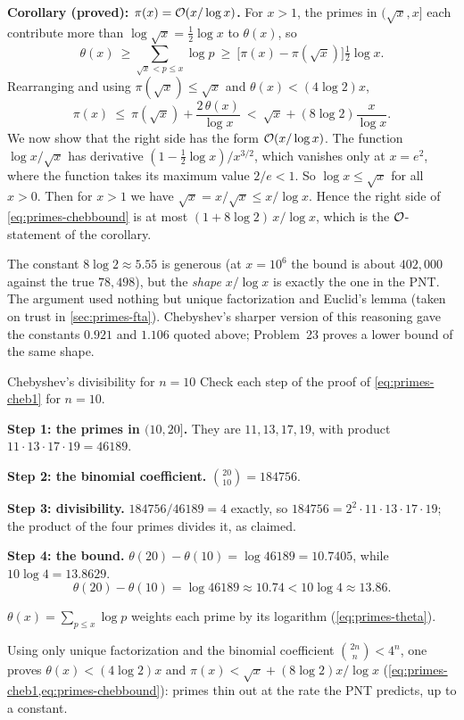 \textbf{Corollary (proved): $\pi(x)=\mathcal{O}(x/\log x)$.} For $x>1$, the primes in $(\sqrt x,x]$ each contribute more than $\log\sqrt x=\tfrac12\log x$ to $\theta(x)$, so
\[
\theta(x)\ \ge \sum_{\sqrt x<p\le x}\log p\ \ge\ \bigl[\pi(x)-\pi(\sqrt x)\bigr]\tfrac12\log x .
\]
Rearranging and using $\pi(\sqrt x)\le\sqrt x$ and $\theta(x)<(4\log2)x$,
\begin{equation}
\pi(x)\ \le\ \pi(\sqrt x)+\frac{2\,\theta(x)}{\log x}\ <\ \sqrt x+(8\log2)\frac{x}{\log x}.
\label{eq:primes-chebbound}
\end{equation}
We now show that the right side has the form $\mathcal{O}(x/\log x)$. The function $\log x/\sqrt x$ has derivative $(1-\tfrac12\log x)/x^{3/2}$, which vanishes only at $x=e^2$, where the function takes its maximum value $2/e<1$. So $\log x\le\sqrt x$ for all $x>0$. Then for $x>1$ we have $\sqrt x=x/\sqrt x\le x/\log x$. Hence the right side of \cref{eq:primes-chebbound} is at most $(1+8\log2)\,x/\log x$, which is the $\mathcal{O}$-statement of the corollary.

The constant $8\log2\approx5.55$ is generous (at $x=10^6$ the bound is about $402{,}000$ against the true $78{,}498$), but the \emph{shape} $x/\log x$ is exactly the one in the PNT. The argument used nothing but unique factorization and Euclid's lemma (taken on trust in \cref{sec:primes-fta}). Chebyshev's sharper version of this reasoning gave the constants $0.921$ and $1.106$ quoted above; Problem~23 proves a lower bound of the same shape.

\begin{sample}{Chebyshev's divisibility for $n=10$}
Check each step of the proof of \cref{eq:primes-cheb1} for $n=10$.

\textbf{Step 1: the primes in $(10,20]$.} They are $11,13,17,19$, with product $11\cdot13\cdot17\cdot19=46189$.

\textbf{Step 2: the binomial coefficient.} $\binom{20}{10}=184756$.

\textbf{Step 3: divisibility.} $184756/46189=4$ exactly, so $184756=2^2\cdot11\cdot13\cdot17\cdot19$; the product of the four primes divides it, as claimed.

\textbf{Step 4: the bound.} $\theta(20)-\theta(10)=\log46189=10.7405$, while $10\log4=13.8629$.
\[
\boxed{\theta(20)-\theta(10)=\log 46189\approx10.74<10\log4\approx13.86.}
\]
\end{sample}

\begin{keyideas}
\item $\theta(x)=\sum_{p\le x}\log p$ weights each prime by its logarithm (\cref{eq:primes-theta}).
\item Using only unique factorization and the binomial coefficient $\binom{2n}{n}<4^n$, one proves $\theta(x)<(4\log2)x$ and $\pi(x)<\sqrt x+(8\log2)x/\log x$ (\cref{eq:primes-cheb1,eq:primes-chebbound}): primes thin out at the rate the PNT predicts, up to a constant.
\end{keyideas}

